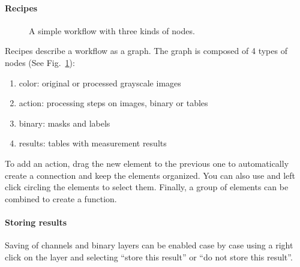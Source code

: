 \paragraph{Recipes}
\begin{figure}
    \centering \small
    \caption{A simple workflow with three kinds of nodes.}
    \label{fig:nodes}
\end{figure}

Recipes describe a workflow as a graph. The graph is composed of 4 types of nodes (See Fig.~\ref{fig:nodes}):
\begin{enumerate}\setlength\itemsep{0em}
    \item color: original or processed grayscale images
    \item action: processing steps on images, binary or tables
    \item binary: masks and labels
    \item results: tables with measurement results 
\end{enumerate}

To add an action, drag the new element to the previous one to automatically create a connection and keep the elements organized. You can also use \keys{\shift} and left click circling the elements to select them. Finally, a group of elements can be combined to create a function.

\paragraph{Storing results}

Saving of channels and binary layers can be enabled case by case using a right click on the layer and selecting ``store this result'' or ``do not store this result''.


